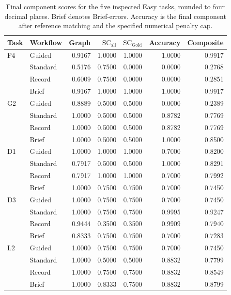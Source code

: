 \begin{table}[!htbp]
\centering
\small
\setlength{\tabcolsep}{4pt}
\caption{Final component scores for the five inspected Easy tasks, rounded to four decimal places. Brief denotes Brief-errors. Accuracy is the final component after reference matching and the specified numerical penalty cap.}
\label{tab:si-easy-case-audit}
\begin{tabular}{llrrrrr}
\toprule
Task & Workflow & Graph & $\mathrm{SC}_{\mathrm{all}}$ & $\mathrm{SC}_{\mathrm{Gold}}$ & Accuracy & Composite \\
\midrule
F4 & Guided & 0.9167 & 1.0000 & 1.0000 & 1.0000 & 0.9917 \\
 & Standard & 0.5176 & 0.7500 & 0.0000 & 0.0000 & 0.2768 \\
 & Record & 0.6009 & 0.7500 & 0.0000 & 0.0000 & 0.2851 \\
 & Brief & 0.9167 & 1.0000 & 1.0000 & 1.0000 & 0.9917 \\
\addlinespace
G2 & Guided & 0.8889 & 0.5000 & 0.5000 & 0.0000 & 0.2389 \\
 & Standard & 1.0000 & 0.5000 & 0.5000 & 0.8782 & 0.7769 \\
 & Record & 1.0000 & 0.5000 & 0.5000 & 0.8782 & 0.7769 \\
 & Brief & 1.0000 & 0.5000 & 0.5000 & 1.0000 & 0.8500 \\
\addlinespace
D1 & Guided & 1.0000 & 1.0000 & 1.0000 & 0.7000 & 0.8200 \\
 & Standard & 0.7917 & 0.5000 & 0.5000 & 1.0000 & 0.8291 \\
 & Record & 0.7917 & 1.0000 & 1.0000 & 0.7000 & 0.7992 \\
 & Brief & 1.0000 & 0.7500 & 0.7500 & 0.7000 & 0.7450 \\
\addlinespace
D3 & Guided & 1.0000 & 0.7500 & 0.7500 & 0.7000 & 0.7450 \\
 & Standard & 1.0000 & 0.7500 & 0.7500 & 0.9995 & 0.9247 \\
 & Record & 0.9444 & 0.3500 & 0.3500 & 0.9909 & 0.7940 \\
 & Brief & 0.8333 & 0.7500 & 0.7500 & 0.7000 & 0.7283 \\
\addlinespace
L2 & Guided & 1.0000 & 0.7500 & 0.7500 & 0.7000 & 0.7450 \\
 & Standard & 1.0000 & 0.5000 & 0.5000 & 0.8832 & 0.7799 \\
 & Record & 1.0000 & 0.7500 & 0.7500 & 0.8832 & 0.8549 \\
 & Brief & 1.0000 & 0.8333 & 0.7500 & 0.8832 & 0.8799 \\
\bottomrule
\end{tabular}
\end{table}

